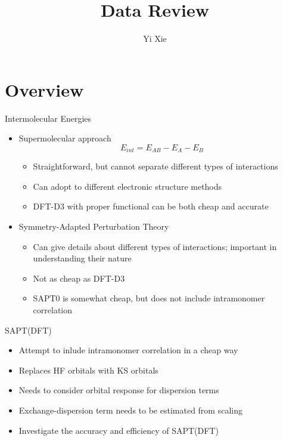 \documentclass{beamer}
\title{Data Review}
\author{Yi Xie}
\begin{document}
\GTtitle

\section{Overview}

    \begin{frame}{Intermolecular Energies}
        \begin{itemize}
            \item Supermolecular approach 
                $$E_{int} = E_{AB} - E_A - E_B$$
                \begin{itemize}
                    \item Straightforward, but cannot separate different types of interactions
                    \item Can adopt to different electronic structure methods
                    \item DFT-D3 with proper functional can be both cheap and accurate
                \end{itemize}
            \item Symmetry-Adapted Perturbation Theory
            \begin{itemize}
                \item Can give details about different types of interactions; important in understanding their nature 
                \item Not as cheap as DFT-D3
                \item SAPT0 is somewhat cheap, but does not include intramonomer correlation
            \end{itemize}
        \end{itemize}
    \end{frame}

    \begin{frame}{SAPT(DFT)}
        \begin{itemize}
            \item Attempt to inlude intramonomer correlation in a cheap way
            \item Replaces HF orbitals with KS orbitals
            \item Needs to consider orbital response for dispersion terms
            \item Exchange-dispersion term needs to be estimated from scaling 
            \item Investigate the accuracy and efficiency of SAPT(DFT)
        \end{itemize}
    \end{frame}
\end{document}
